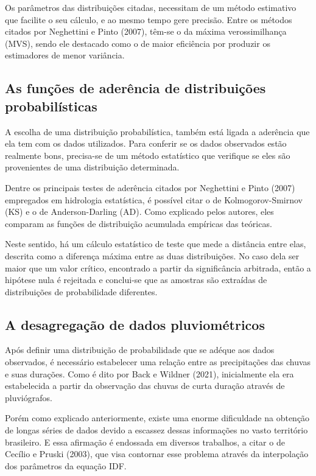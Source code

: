 Os parâmetros das distribuições citadas, necessitam de um método estimativo que facilite o seu cálculo, e ao mesmo tempo gere precisão. Entre os métodos citados por Neghettini e Pinto (2007), têm-se o da máxima verossimilhança (MVS), sendo ele destacado como o de maior eficiência por produzir os estimadores de menor variância.

\subsection{As funções de aderência de distribuições probabilísticas}

A escolha de uma distribuição probabilística, também está ligada a aderência que ela tem com os dados utilizados. Para conferir se os dados observados estão realmente bons, precisa-se de um método estatístico que verifique se eles são provenientes de uma distribuição determinada. 

Dentre os principais testes de aderência citados por Neghettini e Pinto (2007) empregados em hidrologia estatística, é possível citar o de Kolmogorov-Smirnov (KS) e o de Anderson-Darling (AD). Como explicado pelos autores, eles comparam as funções de distribuição acumulada empíricas das teóricas.

Neste sentido, há um cálculo estatístico de teste que mede a distância entre elas, descrita como a diferença máxima entre as duas distribuições. No caso dela ser maior que um valor crítico, encontrado a partir da significância arbitrada, então a hipótese nula é rejeitada e conclui-se que as amostras são extraídas de distribuições de probabilidade diferentes.

\subsection{A desagregação de dados pluviométricos}

Após definir uma distribuição de probabilidade que se adéque aos dados observados, é necessário estabelecer uma relação entre as precipitações das chuvas e suas durações. Como é dito por Back e Wildner (2021), inicialmente ela era estabelecida a partir da observação das chuvas de curta duração através de pluviógrafos.

Porém como explicado anteriormente, existe uma enorme dificuldade na obtenção de longas séries de dados devido a escassez dessas informações no vasto território brasileiro. E essa afirmação é endossada em diversos trabalhos, a citar o de Cecílio e Pruski (2003), que visa contornar esse problema através da interpolação dos parâmetros da equação IDF.


